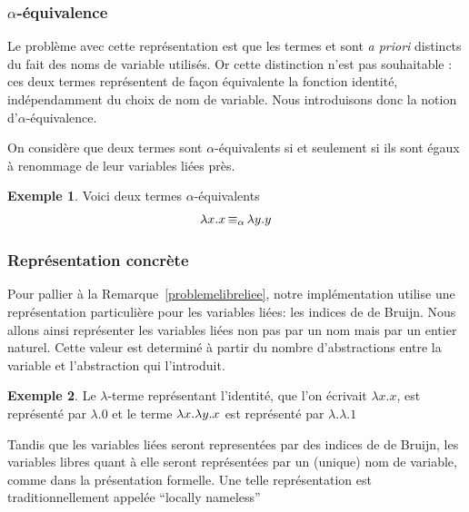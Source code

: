 \documentclass {article}
\theoremstyle{definition}
\newtheorem{example}{Exemple}
\theoremstyle{remark}
\begin{document}
\subsubsection{$\alpha$-équivalence}
\label{alpha_equiv}
\label{problemelibreliee}

\newcommand{\equivAlpha}{\mathop{\equiv_\alpha}}

Le problème avec cette représentation est que les termes
 et  sont \textit{a
  priori} distincts du fait des noms de variable utilisés. Or cette
distinction n'est pas souhaitable : ces deux termes représentent de
façon équivalente la fonction identité, indépendamment du choix de nom
de variable. Nous introduisons donc la notion d'$\alpha$-équivalence.

On considère que deux termes sont \(\alpha\)-équivalents si et seulement si ils sont 
égaux à renommage de leur variables liées près. 
\begin{example}
  Voici deux termes \(\alpha\)-équivalents 
  \begin{align*}
    & \Lam{x}{\Var{x}} \equivAlpha \Lam{y}{\Var{y}} \\
  \end{align*}
\end{example}

\subsubsection{Représentation concrète}
 
Pour pallier à la Remarque~\ref{problemelibreliee}, notre implémentation utilise une représentation
particulière pour les variables liées: les indices de de Bruijn.  Nous
allons ainsi représenter les variables liées non pas par un nom mais
par un entier naturel. Cette valeur est determiné à partir du nombre
d'abstractions entre la variable et l'abstraction qui l'introduit.

\begin{example}
  Le $\lambda$-terme représentant l'identité, que l'on écrivait \(\lambda x.x\), est représenté par \(\lambda.0\)
  et le terme $\lambda x. \lambda y. x$ est représenté par $\lambda.\lambda.1$ 
\end{example}

Tandis que les variables liées seront representées par des
indices de de Bruijn, les variables libres quant à elle seront
représentées par un (unique) nom de variable, comme dans la
présentation formelle. Une telle représentation est traditionnellement
appelée ``locally nameless''~\citep{chargueraud:locally-nameless}
\end{document}

